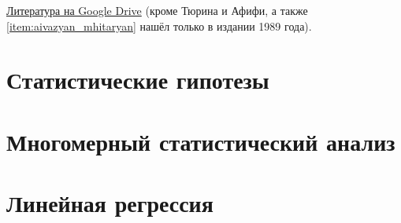 \documentclass[a4paper,12pt]{report}
\begin{document}
    \href{https://drive.google.com/drive/folders/18WM37ML5G8PERAv0esU2HV9sqEgyejj0?usp=sharing}{Литература на Google Drive} (кроме Тюрина и Афифи, а также \ref{item:aivazyan_mhitaryan} нашёл только в издании 1989 года).

    \chapter{Статистические гипотезы}
    
    

    \chapter{Многомерный статистический анализ}
    

    \chapter{Линейная регрессия}
    
    
    
\end{document}
